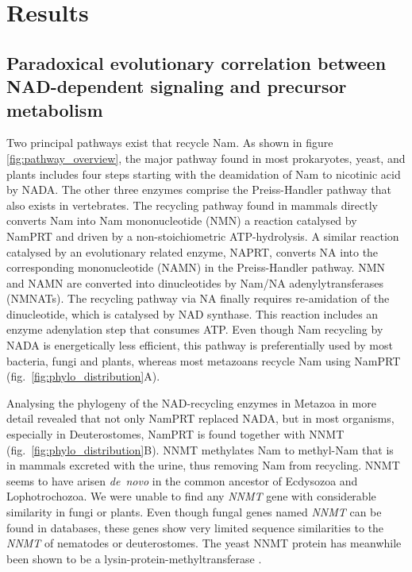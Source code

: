 
\section{Results}

\subsection{Paradoxical evolutionary correlation between NAD-dependent signaling and precursor metabolism}

Two principal pathways exist that recycle Nam. As shown in figure \ref{fig:pathway_overview}, the major pathway found in most prokaryotes, yeast, and plants includes four steps starting with the deamidation of Nam to nicotinic acid by NADA. The other three enzymes comprise the Preiss-Handler pathway that also exists in vertebrates. The recycling pathway found in mammals directly converts Nam into Nam mononucleotide (NMN) a reaction catalysed by NamPRT and driven by a non-stoichiometric ATP-hydrolysis. A similar reaction catalysed by an evolutionary related enzyme, NAPRT, converts NA into the corresponding mononucleotide (NAMN) in the Preiss-Handler pathway. NMN and NAMN are converted into dinucleotides by Nam/NA adenylytransferases (NMNATs). The recycling pathway via NA finally requires re-amidation of the dinucleotide, which is catalysed by NAD synthase. This reaction includes an enzyme adenylation step that consumes ATP. Even though Nam recycling by NADA is energetically less efficient, this pathway is preferentially used by most bacteria, fungi and plants, whereas most metazoans recycle Nam using NamPRT (fig.~\ref{fig:phylo_distribution}A).

Analysing the phylogeny of the NAD-recycling enzymes in Metazoa in more detail revealed that not only NamPRT replaced NADA, but in most organisms, especially in Deuterostomes, NamPRT is found together with NNMT (fig.~\ref{fig:phylo_distribution}B). NNMT methylates Nam to methyl-Nam that is in mammals excreted with the urine, thus removing Nam from recycling. NNMT seems to have arisen \textit{de~novo} in the common ancestor of Ecdysozoa and Lophotrochozoa. We were unable to find any \textit{NNMT} gene with considerable  similarity in fungi or plants. Even though fungal genes named \textit{NNMT} can be found in databases, these genes show very limited sequence similarities to the \textit{NNMT} of nematodes or deuterostomes. The yeast NNMT protein has meanwhile been shown to be a lysin-protein-methyltransferase \cite{Wlodarski2011}.

